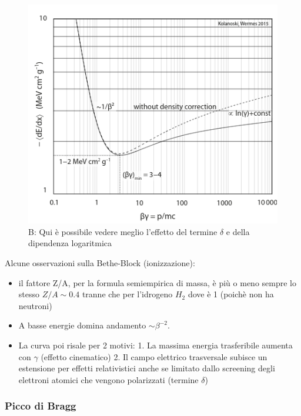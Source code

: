\begin{minipage}{0.48\textwidth}

\begin{figure}[H]
    \centering
    \includegraphics[width=\textwidth,frame]{Chapters/images/Interazione_radiazione_materia/image-20220214175429234.png}
    \captionsetup{width=\textwidth}
    \caption{B: Qui è possibile vedere meglio l'effetto del termine $\delta$ e della dipendenza logaritmica}
    \label{fig:}
\end{figure}

\end{minipage}
Alcune osservazioni sulla Bethe-Block (ionizzazione):
\begin{itemize}
    \item il fattore Z/A, per la formula semiempirica di massa, è più o meno sempre lo stesso $Z/A\sim 0.4$ tranne che per l'idrogeno $H_2$ dove è 1 (poichè non ha neutroni)
    \item A basse energie domina andamento $\sim \beta^{-2}$. 
    \item La curva poi risale per 2 motivi: 
    1. La massima energia trasferibile aumenta con $ \gamma$ (effetto cinematico)
    2. Il campo elettrico trasversale subisce un estensione per effetti relativistici anche se limitato dallo screening degli elettroni atomici che vengono polarizzati (termine $\delta$)
\end{itemize}

\subsubsection*{Picco di Bragg}

